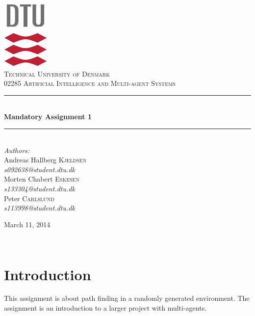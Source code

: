 \documentclass[11pt]{report}
\newcommand{\HRule}{\rule{\linewidth}{0.5mm}}
\begin{document}
\begin{titlepage}
\begin{center}

\includegraphics[scale=2.0]{../GFX/dtu_logo.pdf}\\[1cm]

\textsc{\LARGE Technical University of Denmark}\\[1.5cm]

\textsc{\Large 02285 Artificial Intelligence and Multi-agent Systems}\\[0.5cm]


\HRule \\[0.4cm]
{\huge \bfseries Mandatory Assignment 1}\\[0.1cm]
\HRule \\[1.5cm]

\large
\emph{Authors:}
\\[10pt]
Andreas Hallberg \textsc{Kjeldsen}\\
\emph{s092638@student.dtu.dk}
\\[10pt]
Morten Chabert \textsc{Eskesen}\\
\emph{s133304@student.dtu.dk}
\\[10pt]
Peter \textsc{Carlslund}\\
\emph{s113998@student.dtu.dk}


\vfill

{\large March 11, 2014}

\end{center}
\end{titlepage}

${}$
\section*{Introduction}
This assignment is about path finding in a randomly generated environment. The assignment is an introduction to a larger project with multi-agents.
\end{document}
